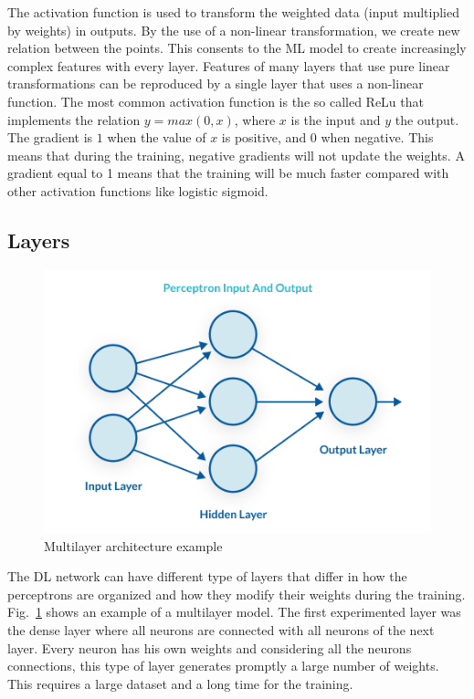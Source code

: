 \documentclass[12pt]{report}
\begin{document}
The activation function is used to transform the weighted data (input multiplied by weights) 
in outputs.
By the use of a non-linear transformation, we create new relation between the points.
This consents to the ML model to create increasingly complex features with every layer.
Features of many layers that use pure linear transformations can be reproduced by a single 
layer that uses a non-linear function. 
The most common activation function is the so called ReLu that
implements the relation $y = max(0, x)$, where $x$ is the input and $y$ the output. The gradient is $1$ when the value of $x$ is positive, 
and 0 when negative. This means that during the training, negative gradients will not update the weights.
A gradient equal to 1 means that the training will be much faster compared with other activation functions
like logistic sigmoid.

\subsection{Layers}

\begin{figure}[t]
    \centering
    \includegraphics[scale=.5]{multilayer-perceptron.png}
    \caption{Multilayer architecture example \cite{percepimage}}
    \label{fig:multilayer}
\end{figure}

The DL network can have different type of layers that differ in how the perceptrons are organized and 
how they modify their weights during the training. 
Fig.~\ref{fig:multilayer} shows an example of a multilayer model.
The first experimented layer was the dense layer where all neurons are connected
with all neurons of the next layer. Every neuron has his own weights
and considering all the neurons connections, this type of layer generates promptly a large number of weights.
This requires a large
dataset and a long time for the training. 
\end{document}
